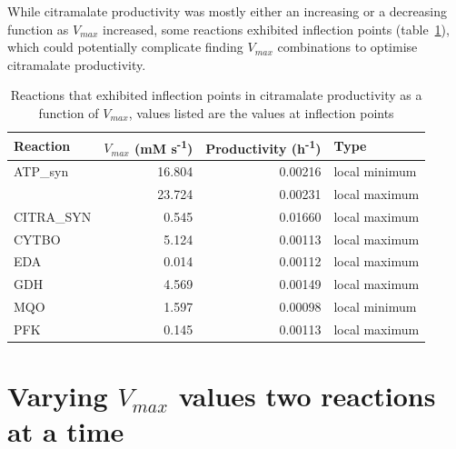 \documentclass[parskip=full, numbers=noenddot]{scrreprt}
\begin{document}
While citramalate productivity was mostly either an increasing or a decreasing function as $V_{max}$ increased, some reactions exhibited inflection points (table~\ref{tab:inflection}), which could potentially complicate finding $V_{max}$ combinations to optimise citramalate productivity.

\begin{table}[h]
  \caption{Reactions that exhibited inflection points in citramalate productivity as a function of $V_{max}$, values listed are the values at inflection points}
  \label{tab:inflection}
  \centering
  \begin{tabular}{lrrl}
    \toprule
    Reaction & $V_{max}$ (mM s\textsuperscript{-1}) & Productivity (h\textsuperscript{-1}) & Type\\
    \midrule
    ATP\_syn & 16.804 & 0.00216 & local minimum\\
    & 23.724 & 0.00231 & local maximum\\
    CITRA\_SYN & 0.545 & 0.01660 & local maximum\\
    CYTBO & 5.124 & 0.00113 & local maximum\\
    EDA & 0.014 & 0.00112 & local maximum\\
    GDH & 4.569 & 0.00149 & local maximum\\
    MQO & 1.597 & 0.00098 & local minimum\\
    PFK & 0.145 & 0.00113 & local maximum\\
    \bottomrule
  \end{tabular}
\end{table}


\section{Varying $V_{max}$ values two reactions at a time}
\label{sec:couples}
\end{document}
